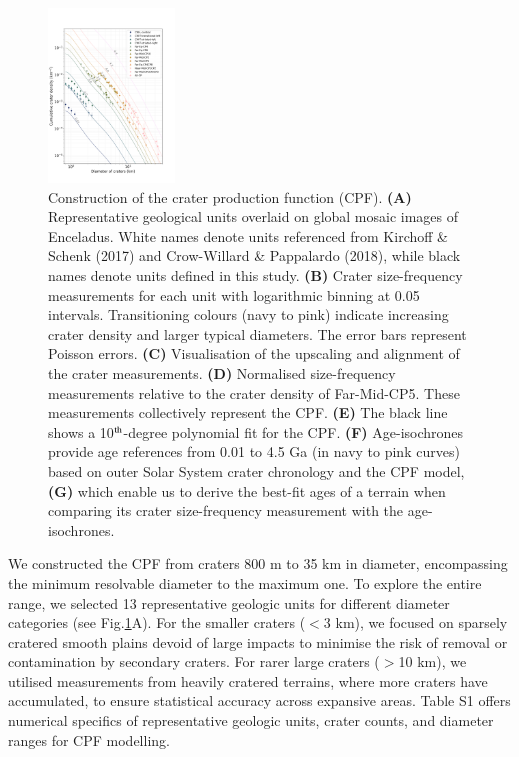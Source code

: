 \documentclass[preprint,12pt,3p,times,authoryear]{elsarticle}
\begin{document}
\begin{figure}[ht!]
    \includegraphics[width=0.3\textwidth]{fig1f.png}
    \caption{Construction of the crater production function (CPF).
        \textbf{(A)} Representative geological units overlaid on global mosaic images of Enceladus. White names denote units referenced from Kirchoff \& Schenk (2017) and Crow-Willard \& Pappalardo (2018), while black names denote units defined in this study.
        \textbf{(B)} Crater size-frequency measurements for each unit with logarithmic binning at 0.05 intervals. Transitioning colours (navy to pink) indicate increasing crater density and larger typical diameters. The error bars represent Poisson errors.
        \textbf{(C)} Visualisation of the upscaling and alignment of the crater measurements.
        \textbf{(D)} Normalised size-frequency measurements relative to the crater density of Far-Mid-CP5. These measurements collectively represent the CPF.
        \textbf{(E)} The black line shows a 10$^{\rm th}$-degree polynomial fit for the CPF.
        \textbf{(F)} Age-isochrones provide age references from 0.01 to 4.5 Ga (in navy to pink curves) based on outer Solar System crater chronology and the CPF model,
        \textbf{(G)} which enable us to derive the best-fit ages of a terrain when comparing its crater size-frequency measurement with the age-isochrones.}
    \label{fig:age}
\end{figure}

We constructed the CPF from craters 800 m to 35 km in diameter, encompassing the minimum resolvable diameter to the maximum one. To explore the entire range, we selected 13 representative geologic units for different diameter categories (see Fig.\ref{fig:age}A). For the smaller craters ($<$3 km), we focused on sparsely cratered smooth plains devoid of large impacts to minimise the risk of removal or contamination by secondary craters. For rarer large craters ($>$10 km), we utilised measurements from heavily cratered terrains, where more craters have accumulated, to ensure statistical accuracy across expansive areas.
 Table S1 offers numerical specifics of representative geologic units, crater counts, and diameter ranges for CPF modelling. \\
\end{document}
